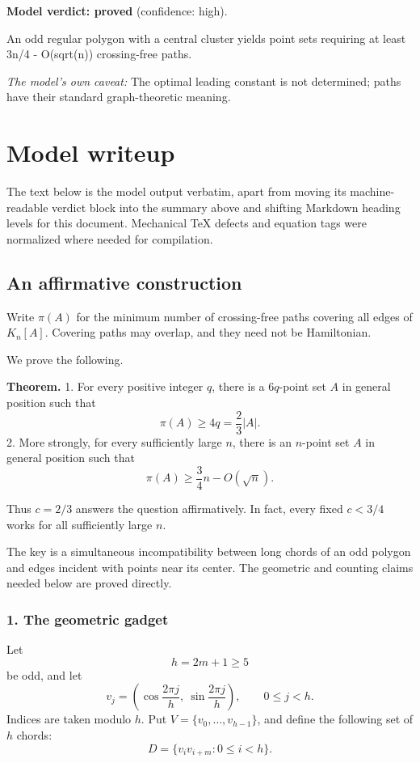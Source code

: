 \documentclass[
  11pt,
  a4paper,
]{article}
\begin{document}
\textbf{Model verdict: proved} (confidence: high).

An odd regular polygon with a central cluster yields point sets
requiring at least 3n/4 - O(sqrt(n)) crossing-free paths.

\emph{The model's own caveat:} The optimal leading constant is not
determined; paths have their standard graph-theoretic meaning.

\section{Model writeup}\label{model-writeup}

The text below is the model output verbatim, apart from moving its
machine-readable verdict block into the summary above and shifting
Markdown heading levels for this document. Mechanical TeX defects and
equation tags were normalized where needed for compilation.

\subsection{An affirmative
construction}\label{an-affirmative-construction}

Write \(\pi(A)\) for the minimum number of crossing-free paths covering
all edges of \(K_n[A]\). Covering paths may overlap, and they need not
be Hamiltonian.

We prove the following.

\textbf{Theorem.} 1. For every positive integer \(q\), there is a
\(6q\)-point set \(A\) in general position such that \[
   \pi(A)\ge 4q=\frac23|A|.
   \] 2. More strongly, for every sufficiently large \(n\), there is an
\(n\)-point set \(A\) in general position such that \[
   \pi(A)\ge \frac34n-O(\sqrt n).
   \]

Thus \(c=2/3\) answers the question affirmatively. In fact, every fixed
\(c<3/4\) works for all sufficiently large \(n\).

The key is a simultaneous incompatibility between long chords of an odd
polygon and edges incident with points near its center. The geometric
and counting claims needed below are proved directly.

\subsubsection{1. The geometric gadget}\label{the-geometric-gadget}

Let \[
h=2m+1\ge 5
\] be odd, and let \[
v_j=\left(\cos\frac{2\pi j}{h},\ \sin\frac{2\pi j}{h}\right),
\qquad 0\le j<h.
\] Indices are taken modulo \(h\). Put \(V=\{v_0,\ldots,v_{h-1}\}\), and
define the following set of \(h\) chords: \[
D=\{v_i v_{i+m}:0\le i<h\}.
\]
\end{document}
